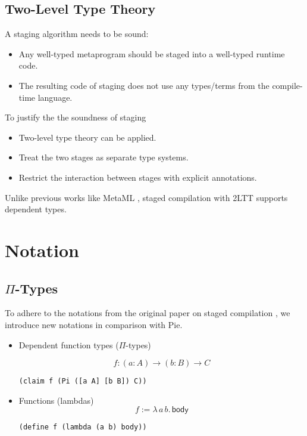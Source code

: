 \documentclass[handout]{beamer}
\newenvironment{fr}[1][]
{\begin{frame}[fragile,environment=fr,#1]}
{\end{frame}}
\begin{document}
\subsection{Two-Level Type Theory}
\begin{fr}{\subsecname}

A staging algorithm needs to be sound:

\begin{itemize}
    \item\pause Any well-typed metaprogram should be staged into a well-typed runtime code.
    \item\pause The resulting code of staging does not use any types/terms from the compile-time language.
\end{itemize}
\pause 
To justify the the soundness of staging

\begin{itemize}
    \item\pause  Two-level type theory can be applied.
    \item\pause  Treat the two stages as separate type systems.
    \item\pause  Restrict the interaction between stages with explicit annotations.
\end{itemize}
\pause
Unlike previous works like MetaML \cite{metaml}, staged compilation with 2LTT supports dependent types.

\end{fr}

\section{Notation}

\subsection{$\Pi$-Types}
\begin{fr}{\subsecname}

To adhere to the notations from the original paper on staged compilation \cite{staged}, we introduce new notations in comparison with Pie.

\begin{itemize}
    \item \pause Dependent function types ($\Pi$-types)

    $$f:(a:A)\to (b:B)\to C$$
\begin{CenteredBox}
\lstinline{(claim f (Pi ([a A] [b B]) C))}
\end{CenteredBox}
    \item \pause Functions (lambdas)
    $$f:=\lambda\,a\,b.\,\mathsf{body}$$
\begin{CenteredBox}
\lstinline{(define f (lambda (a b) body))}
\end{CenteredBox}
\end{itemize}
\end{fr}
\end{document}
